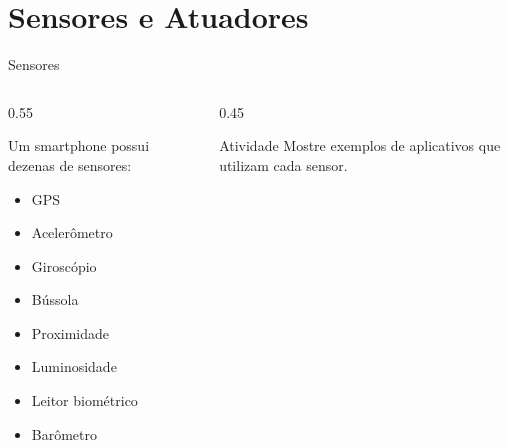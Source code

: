 \documentclass[aspectratio=169]{beamer}
\begin{document}
\section{Sensores e Atuadores}

\begin{frame}{Sensores}
    \begin{columns}[T]
        \begin{column}{0.55\textwidth}
            \begin{block}{Um smartphone possui dezenas de sensores:}
                \begin{itemize}
                    \item GPS
                    \item Acelerômetro
                    \item Giroscópio
                    \item Bússola
                    \item Proximidade
                    \item Luminosidade
                    \item Leitor biométrico
                    \item Barômetro
                \end{itemize}
            \end{block}
        \end{column}
        \begin{column}{0.45\textwidth}
            \begin{exampleblock}{Atividade}
                Mostre exemplos de aplicativos que utilizam cada sensor.
            \end{exampleblock}
        \end{column}
    \end{columns}
\end{frame}
\end{document}

